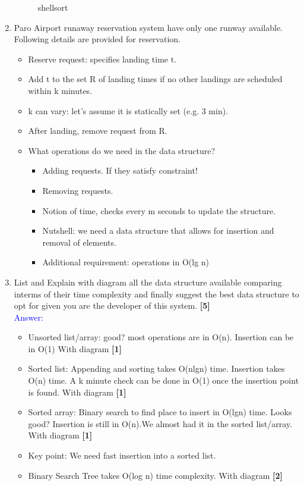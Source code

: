 \documentclass[12pt ,a4paper]{exam}
\begin{document}
\begin{enumerate}[start=1,label={\bfseries Q\arabic*)}]
\begin{figure}[h]
		\caption{shellsort}
		\label{fig:screenshot-2020-12-26-at-9}
	\end{figure}
     \pagebreak
		\item Paro Airport runaway reservation system have only one runway available. Following details are provided for reservation. 
	\begin{itemize}
		\item Reserve request: specifies landing time t.
		\item Add t to the set R of landing times if no other landings are
		scheduled within k minutes.
		\item k can vary: let’s assume it is statically set (e.g. 3 min). 
		\item After landing, remove request from R.
		\item What operations do we need in the data structure?
		\begin{itemize}
			\item Adding requests. If they satisfy constraint!
			\item Removing requests.
			\item Notion of time, checks every m seconds to update the structure.
			\item Nutshell: we need a data structure that allows for insertion and removal of elements.
			\item Additional requirement: operations in O(lg n)
		\end{itemize}
	\end{itemize}
	\item [] List and Explain with diagram all the data structure available comparing interms of their time complexity and finally suggest the best data structure to opt for given you are the developer of this system.  \hfill\textbf{[5]}\\
	\textcolor{blue}{Answer: } 
	\begin{itemize}
		\item Unsorted list/array: good? most operations are in O(n). Insertion can be in O(1) With diagram \hfill\textbf{[1]}\\
		\item Sorted list: Appending and sorting takes O(nlgn) time. Insertion takes O(n) time.  A k minute check can be done in O(1) once the insertion point is found. With diagram \hfill\textbf{[1]}\\
		\item Sorted array: Binary search to find place to insert in O(lgn) time. Looks good? Insertion is still in O(n).We almost had it in the sorted list/array. With diagram \hfill\textbf{[1]}\\
		\item Key point: We need fast insertion into a sorted list.
		\item Binary Search Tree takes O(log n) time complexity.  With diagram \hfill\textbf{[2]}\\
		

\end{itemize}
\end{enumerate}
\end{document}
